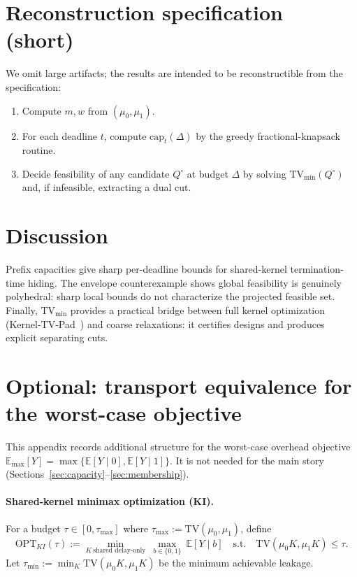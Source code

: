 \documentclass[11pt]{article}
\newcommand{\TV}{\mathrm{TV}}
\newcommand{\E}{\mathbb{E}}
\begin{document}
\section{Reconstruction specification (short)}\label{sec:recon}

We omit large artifacts; the results are intended to be reconstructible from the specification:
\begin{enumerate}[leftmargin=1.5em, itemsep=2pt]
\item Compute $m,w$ from $(\mu_0,\mu_1)$.
\item For each deadline $t$, compute $\mathrm{cap}_t(\Delta)$ by the greedy fractional-knapsack routine.
\item Decide feasibility of any candidate $Q^\circ$ at budget $\Delta$ by solving $\TV_{\min}(Q^\circ)$ and, if infeasible, extracting a dual cut.
\end{enumerate}

\section{Discussion}
Prefix capacities give sharp per-deadline bounds for shared-kernel termination-time hiding.
The envelope counterexample shows global feasibility is genuinely polyhedral: sharp local bounds do not characterize the projected feasible set.
Finally, $\TV_{\min}$ provides a practical bridge between full kernel optimization (Kernel-TV-Pad~\cite{schedcompiler}) and coarse relaxations:
it certifies designs and produces explicit separating cuts.

\appendix

\section{Optional: transport equivalence for the worst-case objective}\label{app:transport}

This appendix records additional structure for the worst-case overhead objective
$\E_{\max}[Y]=\max\{\E[Y\mid 0],\E[Y\mid 1]\}$.
It is not needed for the main story (Sections~\ref{sec:capacity}--\ref{sec:membership}).

\paragraph{Shared-kernel minimax optimization (KI).}
For a budget $\tau\in[0,\tau_{\max}]$ where $\tau_{\max}:=\TV(\mu_0,\mu_1)$, define
\[
\mathrm{OPT}_{KI}(\tau):=\min_{K\ \text{shared delay-only}}\ \max_{b\in\{0,1\}}\ \E[Y\mid b]\quad\text{s.t.}\quad \TV(\mu_0K,\mu_1K)\le \tau.
\]
Let $\tau_{\min}:=\min_K \TV(\mu_0K,\mu_1K)$ be the minimum achievable leakage.
\end{document}

